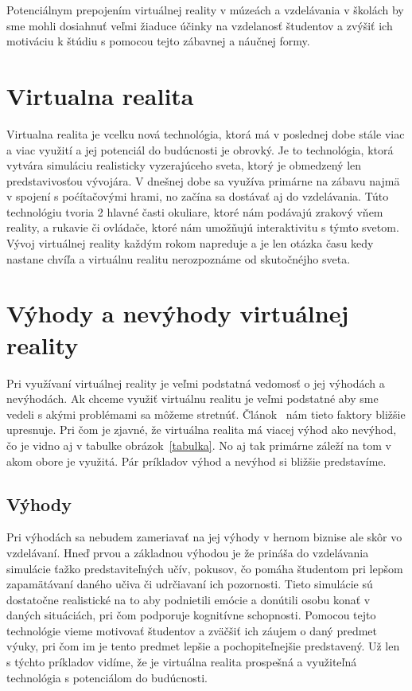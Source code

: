 \documentclass[10pt,oneside,slovak,a4paper]{article}
\begin{document}
Potenciálnym prepojením virtuálnej reality v múzeách a vzdelávania v školách by sme mohli dosiahnuť veľmi žiaduce účinky na vzdelanosť študentov a zvýšiť ich motiváciu k štúdiu s pomocou tejto zábavnej a náučnej formy.

\section{Virtualna realita} \label{realita}
Virtualna realita je vcelku nová technológia, ktorá má v poslednej dobe stále viac a viac využití a jej potenciál do budúcnosti je obrovký. Je to technológia, ktorá vytvára simuláciu realisticky vyzerajúceho sveta, ktorý je obmedzený len predstavivosťou vývojára. V dnešnej dobe sa využíva primárne na zábavu najmä v spojení s poćítačovými hrami, no začína sa dostávať aj do vzdelávania. Túto technológiu tvoria 2 hlavné časti okuliare, ktoré nám podávajú zrakový vňem reality, a rukavie či ovládače, ktoré nám umožňujú interaktivitu s týmto svetom. Vývoj virtuálnej reality každým rokom napreduje a je len otázka času kedy nastane chvíľa a virtuálnu realitu nerozpoznáme od skutočnéjho sveta.~\cite{VR}  

\section{Výhody a nevýhody virtuálnej reality} \label{procon}
Pri využívaní virtuálnej reality je veľmi podstatná vedomosť o jej výhodách a nevýhodách. Ak chceme využiť virtuálnu realitu je veľmi podstatné aby sme vedeli s akými problémami sa môžeme stretnúť. Článok~\cite{Procon} nám tieto faktory bližšie upresnuje. Pri čom je zjavné, že virtuálna realita má viacej výhod ako nevýhod, čo je vidno aj v tabulke obrázok~\ref{tabulka}. No aj tak primárne záleží na tom v akom obore je využitá. Pár príkladov výhod a nevýhod si bližšie predstavíme. 

\subsection{Výhody} \label{procon:vyhody}
Pri výhodách sa nebudem zameriavať na jej výhody v hernom biznise ale skôr vo vzdelávaní. Hneď prvou a základnou výhodou je že prináša do vzdelávania simulácie ťažko predstaviteľných učív, pokusov, čo pomáha študentom pri lepšom zapamätávaní daného učiva či udrčiavaní ich pozornosti. Tieto simulácie sú dostatočne realistické na to aby podnietili emócie a donútili osobu konať v daných situáciách, pri čom podporuje kognitívne schopnosti. Pomocou tejto technológie vieme motivovať študentov a zväčšiť ich záujem o daný predmet výuky, pri čom im je tento predmet lepšie a pochopiteľnejšie predstavený. Už len s týchto príkladov vidíme, že je virtuálna realita prospešná a využiteľná technológia s potenciálom do budúcnosti.~\cite{Procon} 
\end{document}
